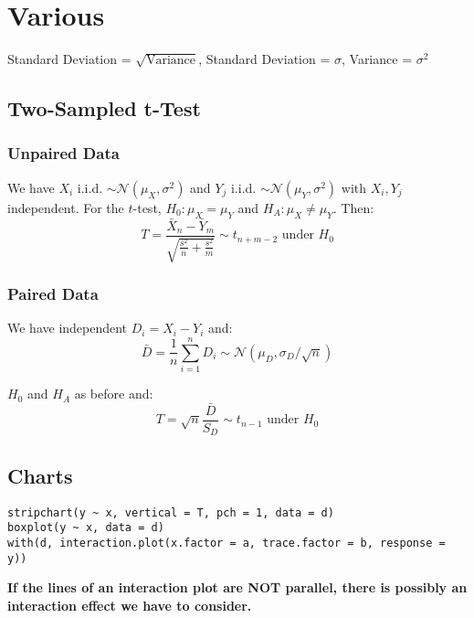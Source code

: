 \section{Various}


\begin{tcolorbox}
	Standard Deviation = $\sqrt{\text{Variance}}$, Standard Deviation = $\sigma$, Variance = $\sigma^2$
\end{tcolorbox}


\subsection{Two-Sampled t-Test}

\subsubsection{Unpaired Data}

We have $X_i$ i.i.d. $\sim \mathcal N(\mu_X, \sigma^2)$ and $Y_j$ i.i.d. $\sim \mathcal N(\mu_Y, \sigma^2)$ with $X_i, Y_j$ independent. For the $t$-test, $H_0: \mu_X = \mu_Y$ and $H_A: \mu_X \neq \mu_Y$. Then:
$$T = \frac{\bar X_n - \bar Y_m}{\sqrt{\frac{s^2}{n} + \frac{s^2}{m}}} \sim t_{n+m-2} \text{ under } H_0$$

\subsubsection{Paired Data}

We have independent $D_i = X_i - Y_i$ and:
$$\bar D = \frac{1}{n} \sum_{i=1}^n D_i \sim \mathcal N(\mu_D, \sigma_D / \sqrt{n})$$

$H_0$ and $H_A$ as before and:
$$T = \sqrt{n} \frac{\bar D}{S_D} \sim t_{n-1} \text{ under } H_0$$

\subsection{Charts}

\begin{lstlisting}
stripchart(y ~ x, vertical = T, pch = 1, data = d)
boxplot(y ~ x, data = d)
with(d, interaction.plot(x.factor = a, trace.factor = b, response = y))
\end{lstlisting}

\textbf{If the lines of an interaction plot are NOT parallel, there is possibly an interaction effect we have to consider.}


